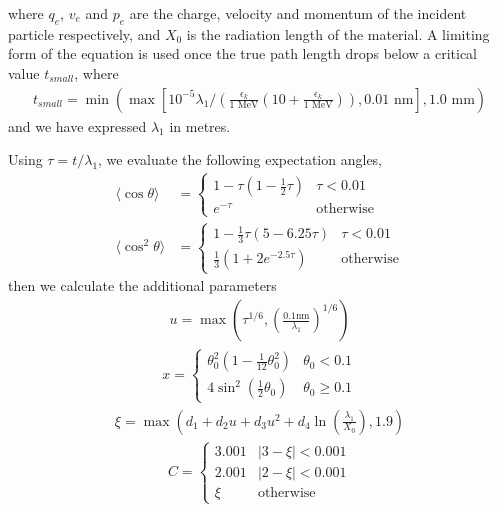 \documentclass[12pt]{article}
\numberwithin{equation}{section}
\begin{document}
%
where $q_e$, $v_e$ and $p_e$ are the charge, velocity and momentum of the incident particle respectively, and $X_0$ is the radiation length of the material. A limiting form of the equation is used once the true path length drops below a critical value $t_{small}$, where 
%
\begin{align}
  t_{small} = \min\left(\max\left[10^{-5}\lambda_1/\left(\frac{\epsilon_k}{1 \text{ MeV}}\left(10 + \frac{\epsilon_k}{1 \text{ MeV}}\right)\right), 0.01 \text{ nm}\right], 1.0 \text{ mm}\right)
\end{align}
%
and we have expressed $\lambda_1$ in metres.

Using $\tau = t/\lambda_1$, we evaluate the following expectation angles,
%
\begin{align}
  \langle\cos\theta\rangle &=
  \begin{cases}
    1 - \tau(1-\frac{1}{2}\tau) & \tau < 0.01 \\
    e^{-\tau} & \text{otherwise}
  \end{cases}
\\  
  \langle\cos^2\theta\rangle &=
  \begin{cases}
    1 - \frac{1}{3}\tau(5-6.25\tau) & \tau< 0.01 \\
    \frac{1}{3}(1+2e^{-2.5\tau}) & \text{otherwise}
  \end{cases}
\end{align}
%
then we calculate the additional parameters
%
\begin{align}
  u = \max\left(\tau^{1/6}, \left(\frac{0.1 \text{nm}}{\lambda_1}\right)^{1/6}\right)
\end{align}
%
\begin{align}
  x = 
    \begin{cases} 
      \theta_0^2\left(1-\frac{1}{12}\theta_0^2\right) & \theta_0 < 0.1\\
      4\sin^2\left(\frac{1}{2}\theta_0\right) & \theta_0 \geq 0.1
    \end{cases}
\end{align}
%
\begin{align}
  \xi = \max\left(d_1 + d_2u + d_3 u^2 + d_4 \ln\left(\frac{\lambda_1}{X_0}\right), 1.9\right)
\end{align}
\begin{align} \label{eq:urban:oddLimits}
  C = 
  \begin{cases}
    3.001 & |3-\xi| < 0.001 \\
    2.001 & |2-\xi| < 0.001 \\
    \xi & \text{otherwise}
  \end{cases}
\end{align}
\end{document}
